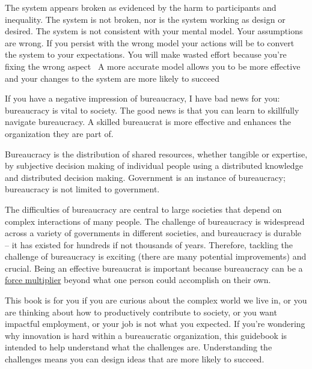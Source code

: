 
The system appears broken as evidenced by the harm to participants and inequality. The system is not broken, nor is the system working as design or desired. The system is not consistent with your mental model. Your assumptions are wrong.
If you persist with the wrong model your actions will be to convert the system to your expectations. You will make wasted effort because you're fixing the wrong aspect 
A more accurate model allows you to be more effective and your changes to the system are more likely to succeed 




If you have a negative impression of bureaucracy, I have bad news for you: bureaucracy is vital to society. The good news is that you can learn to skillfully navigate bureaucracy. A skilled bureaucrat is more effective and enhances the organization they are part of.

Bureaucracy is the distribution of shared resources, whether tangible or expertise, by subjective decision making of individual people using a distributed knowledge and distributed decision making. Government is an instance of bureaucracy; bureaucracy is not limited to government. 

The difficulties of bureaucracy are central  to large societies that depend on complex interactions of many people. The challenge of bureaucracy is widespread across a variety of governments in different societies, and bureaucracy is durable -- it has existed for hundreds if not thousands of years. Therefore, tackling the challenge of bureaucracy is exciting (there are many potential improvements) and crucial. 
Being an effective bureaucrat is important because bureaucracy can be a \href{https://en.wikipedia.org/wiki/Force_multiplication}{force multiplier} beyond what one person could accomplish on their own.

This book is for you if you are curious about the complex world we live in, or you are thinking about how to productively contribute to society, or you want impactful employment, or your job is not what you expected. If you're wondering why innovation is hard within a bureaucratic organization, this guidebook is intended to help understand what the challenges are. Understanding the challenges means you can design ideas that are more likely to succeed.


